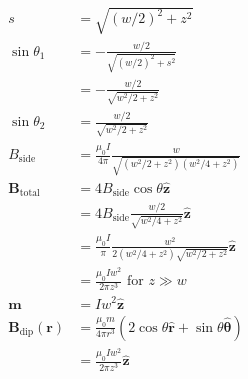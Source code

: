 \documentclass{article}
\renewcommand{\vec}[1]{\boldsymbol{\mathbf{#1}}}
\newcommand{\uvec}[1]{\hat{\vec{#1}}}
\begin{document}
\begin{align*}
  s                           & = \sqrt{(w / 2)^2 + z^2}                                                          \\
  \sin \theta_1               & = -\frac{w / 2}{\sqrt{(w / 2)^2 + s^2}}                                           \\
                              & = -\frac{w / 2}{\sqrt{w^2 / 2 + z^2}}                                             \\
  \sin \theta_2               & = \frac{w / 2}{\sqrt{w^2 / 2 + z^2}}                                              \\
  B_\text{side}               & = \frac{\mu_0 I}{4 \pi} \frac{w}{\sqrt{(w^2 / 2 + z^2) (w^2 / 4 + z^2)}}          \\
  \vec{B}_\text{total}        & = 4 B_\text{side} \cos \theta \uvec{z}                                            \\
                              & = 4 B_\text{side} \frac{w / 2}{\sqrt{w^2 / 4 + z^2}} \uvec{z}                     \\
                              & = \frac{\mu_0 I}{\pi} \frac{w^2}{2 (w^2 / 4 + z^2) \sqrt{w^2 / 2 + z^2}} \uvec{z} \\
                              & = \frac{\mu_0 I w^2}{2 \pi z^3} \text{ for } z \gg w                              \\
  \vec{m}                     & = I w^2 \uvec{z}                                                                  \\
  \vec{B}_\text{dip}(\vec{r}) & = \frac{\mu_0 m}{4 \pi r^3} (2 \cos \theta \uvec{r} + \sin \theta \uvec{\theta})  \\
                              & = \frac{\mu_0 I w^2}{2 \pi z^3} \uvec{z}
\end{align*}

\subsection{}
\end{document}
